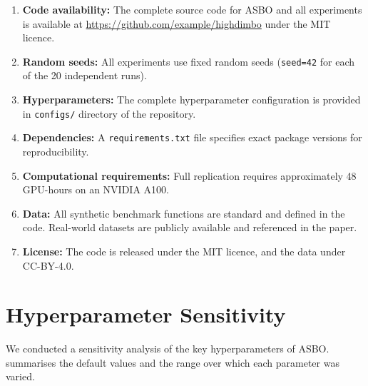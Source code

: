 \begin{enumerate}
    \item \textbf{Code availability:} The complete source code for ASBO and all
    experiments is available at
    \url{https://github.com/example/highdimbo} under the MIT licence.

    \item \textbf{Random seeds:} All experiments use fixed random seeds
    (\texttt{seed=42} for each of the 20 independent runs).

    \item \textbf{Hyperparameters:} The complete hyperparameter configuration
    is provided in \texttt{configs/} directory of the repository.

    \item \textbf{Dependencies:} A \texttt{requirements.txt} file specifies
    exact package versions for reproducibility.

    \item \textbf{Computational requirements:} Full replication requires
    approximately 48 GPU-hours on an NVIDIA A100.

    \item \textbf{Data:} All synthetic benchmark functions are standard and
    defined in the code.  Real-world datasets are publicly available and
    referenced in the paper.

    \item \textbf{License:} The code is released under the MIT licence, and
    the data under CC-BY-4.0.
\end{enumerate}

\section{Hyperparameter Sensitivity}
\label{sec:hyperparameter-sensitivity}

We conducted a sensitivity analysis of the key hyperparameters of ASBO.
 summarises the default values and the range over
which each parameter was varied.

